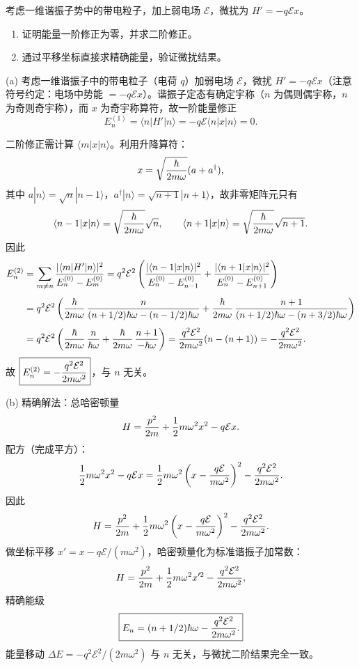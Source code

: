 \begin{question}
考虑一维谐振子势中的带电粒子，加上弱电场 $\mathcal E$，微扰为 $H'=-q\mathcal E x$。
\begin{enumerate}
\item 证明能量一阶修正为零，并求二阶修正。
\item 通过平移坐标直接求精确能量，验证微扰结果。
\end{enumerate}
\end{question}
\begin{solution}
(a) 考虑一维谐振子中的带电粒子（电荷 $q$）加弱电场 $\mathcal E$，微扰 $H'=-q\mathcal Ex$（注意符号约定：电场中势能 $=-q\mathcal E x$）。谐振子定态有确定宇称（$n$ 为偶则偶宇称，$n$ 为奇则奇宇称），而 $x$ 为奇宇称算符，故一阶能量修正
\[
E_n^{(1)}=\langle n|H'|n\rangle=-q\mathcal E\langle n|x|n\rangle=0.
\]

二阶修正需计算 $\langle m|x|n\rangle$。利用升降算符：
\[
x=\sqrt{\hbar\over2m\omega}(a+a^\dagger),
\]
其中 $a|n\rangle=\sqrt{n}|n-1\rangle$，$a^\dagger|n\rangle=\sqrt{n+1}|n+1\rangle$，故非零矩阵元只有
\[
\langle n-1|x|n\rangle=\sqrt{\hbar\over2m\omega}\sqrt{n},
\qquad
\langle n+1|x|n\rangle=\sqrt{\hbar\over2m\omega}\sqrt{n+1}.
\]
因此
\[
\begin{aligned}
E_n^{(2)}&=\sum_{m\ne n}{|\langle m|H'|n\rangle|^2\over E_n^{(0)}-E_m^{(0)}}
=q^2\mathcal E^2\left(
{|\langle n-1|x|n\rangle|^2\over E_n^{(0)}-E_{n-1}^{(0)}}
+{|\langle n+1|x|n\rangle|^2\over E_n^{(0)}-E_{n+1}^{(0)}}\right)\\[4pt]
&=q^2\mathcal E^2\left(
{\hbar\over2m\omega}\,{n\over (n+1/2)\hbar\omega-(n-1/2)\hbar\omega}
+{\hbar\over2m\omega}\,{n+1\over (n+1/2)\hbar\omega-(n+3/2)\hbar\omega}\right)\\[4pt]
&=q^2\mathcal E^2\left(
{\hbar\over2m\omega}\,{n\over \hbar\omega}
+{\hbar\over2m\omega}\,{n+1\over -\hbar\omega}\right)
={q^2\mathcal E^2\over2m\omega^2}(n-(n+1))
=-{q^2\mathcal E^2\over2m\omega^2}.
\end{aligned}
\]
故 $\boxed{E_n^{(2)}=-{q^2\mathcal E^2\over2m\omega^2}}$，与 $n$ 无关。

(b) 精确解法：总哈密顿量
\[
H={p^2\over2m}+{1\over2}m\omega^2x^2-q\mathcal Ex.
\]
配方（完成平方）：
\[
{1\over2}m\omega^2x^2-q\mathcal Ex
={1\over2}m\omega^2\left(x-{q\mathcal E\over m\omega^2}\right)^2-{q^2\mathcal E^2\over2m\omega^2}.
\]
因此
\[
H={p^2\over2m}+{1\over2}m\omega^2\left(x-{q\mathcal E\over m\omega^2}\right)^2-{q^2\mathcal E^2\over2m\omega^2}.
\]
做坐标平移 $x'=x-q\mathcal E/(m\omega^2)$，哈密顿量化为标准谐振子加常数：
\[
H={p^2\over2m}+{1\over2}m\omega^2x'^2-{q^2\mathcal E^2\over2m\omega^2},
\]
精确能级
\[
\boxed{E_n=(n+1/2)\hbar\omega-{q^2\mathcal E^2\over2m\omega^2}.}
\]
能量移动 $\Delta E=-q^2\mathcal E^2/(2m\omega^2)$ 与 $n$ 无关，与微扰二阶结果完全一致。
\end{solution}

